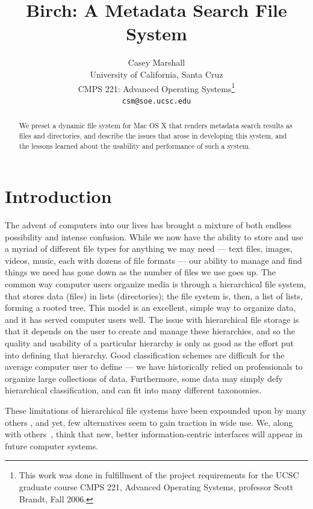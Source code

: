\documentclass{article}
\begin{document}
\title{Birch: A Metadata Search File System}
\author{Casey Marshall \\
  University of California, Santa Cruz \\
  CMPS 221: Advanced Operating Systems\footnote{This work was done in
    fulfillment of the project requirements for the UCSC graduate
    course CMPS 221, Advanced Operating Systems, professor Scott
    Brandt, Fall 2006.} \\
  \texttt{csm@soe.ucsc.edu}}
\maketitle

\begin{abstract}
  We preset a dynamic file system for Mac OS X that renders metadata
  search results as files and directories, and describe the issues
  that arose in developing this system, and the lessons learned about
  the usability and performance of such a system.
\end{abstract}

\section{Introduction}
The advent of computers into our lives has brought a mixture of both
endless possibility and intense confusion. While we now have the
ability to store and use a myriad of different file types for anything
we may need --- text files, images, videos, music, each with dozens of
file formats --- our ability to manage and find things we need has
gone down as the number of files we use goes up. The common way
computer users organize media is through a hierarchical file system,
that stores data (files) in lists (directories); the file system is,
then, a list of lists, forming a rooted tree. This model is an
excellent, simple way to organize data, and it has served computer
users well. The issue with hierarchical file storage is that it
depends on the user to create and manage these hierarchies, and so the
quality and usability of a particular hierarchy is only as good as the
effort put into defining that hierarchy. Good classification schemes
are difficult for the average computer user to define --- we have
historically relied on professionals to organize large collections of
data. Furthermore, some data may simply defy hierarchical
classification, and can fit into many different taxonomies.

These limitations of hierarchical file systems have been expounded
upon by many others \cite{OToole:1992, Nielsen:1996, Gorter:2004,
  Nickell:2006}, and yet, few alternatives seem to gain traction in
wide use.  We, along with others~\cite{Veda:2005}, think that new,
better information-centric interfaces will appear in future computer
systems.
\end{document}
